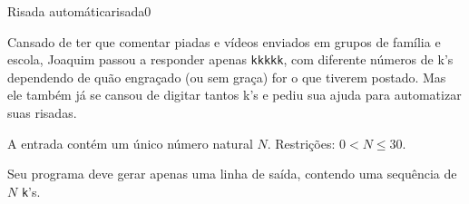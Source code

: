\documentclass[12pt,a4paper,oneside]{article}
\begin{document}
\begin{problem}{Risada automática}{risada}{0}
 
Cansado de ter que comentar piadas e vídeos enviados em grupos de família e escola, Joaquim passou a responder apenas \texttt{kkkkk}, com diferente números de {k}'s dependendo de quão engraçado (ou sem graça) for o que tiverem postado. Mas ele também já se cansou de digitar tantos {k}'s e pediu sua ajuda para automatizar suas risadas. 


%

\InputFile

A entrada contém um único número natural $N$. Restrições: $0 < N \leq 30$.


\OutputFile

Seu programa deve gerar apenas uma linha de saída, contendo uma sequência de $N$ \texttt{k}'s.


\Example

\begin{example}
%
\end{example}

\begin{example}
%
\end{example}

\begin{example}
%
\end{example}




\end{problem}
\end{document}
